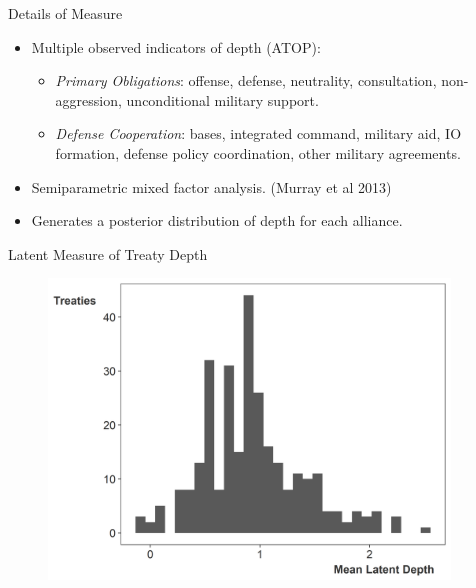 \documentclass[12pt]{beamer}
\begin{document}
\begin{frame}{Details of Measure}
 
\begin{itemize}
\item Multiple observed indicators of depth (ATOP): 
\begin{itemize} 
\item \textit{Primary Obligations}: offense, defense, neutrality, consultation, non-aggression, unconditional military support.
\item \textit{Defense Cooperation}: bases, integrated command, military aid, IO formation, defense policy coordination, other military agreements. 
\end{itemize} 
\pause 
\item Semiparametric mixed factor analysis. (Murray et al 2013)
\pause
\item Generates a posterior distribution of depth for each alliance.
\end{itemize} 


\end{frame} 


\begin{frame}{Latent Measure of Treaty Depth}

\begin{figure}[htbp]
	\centering
		\includegraphics[width=0.95\textwidth]{ld-hist.png}
\end{figure}


\end{frame} 
\end{document}
